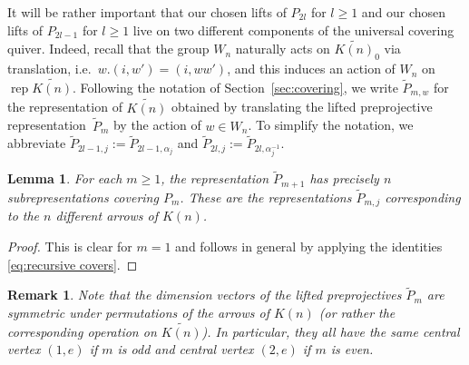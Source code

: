 \documentclass{amsart}
\newtheorem{lemma}[theorem]{Lemma}
\newtheorem{remark}[theorem]{Remark}
\numberwithin{equation}{section}
\newcommand{\rep}{\operatorname{rep}}
\begin{document}
It will be rather important that our chosen lifts of $P_{2l}$ for $l\ge1$ and our chosen lifts of $P_{2l-1}$ for $l\ge1$ live on two different components of the universal covering quiver.
Indeed, recall that the group $W_n$ naturally acts on $\widetilde{K(n)}_0$ via translation, i.e.~$w.(i,w')=(i,ww')$, and this induces an action of $W_n$ on $\rep\widetilde{K(n)}$.
Following the notation of Section~\ref{sec:covering}, we write $\tilde P_{m,w}$ for the representation of $\widetilde{K(n)}$ obtained by translating the lifted preprojective representation~$\tilde P_m$ by the action of $w\in W_n$.
To simplify the notation, we abbreviate $\tilde P_{2l-1,j}:=\tilde P_{2l-1,\alpha_j}$ and $\tilde P_{2l,j}:=\tilde P_{2l,\alpha_j^{-1}}$.
\begin{lemma}
  \label{le:shifted subreps}
  For each $m\ge1$, the representation $\tilde P_{m+1}$ has precisely $n$ subrepresentations covering $P_m$.
  These are the representations $\tilde P_{m,j}$ corresponding to the $n$ different arrows of $K(n)$. 
\end{lemma}
\begin{proof}
  This is clear for $m=1$ and follows in general by applying the identities \eqref{eq:recursive covers}.
\end{proof}
\begin{remark}
  Note that the dimension vectors of the lifted preprojectives $\tilde P_m$ are symmetric under permutations of the arrows of $K(n)$ (or rather the corresponding operation on $\widetilde{K(n)}$).
  In particular, they all have the same central vertex $(1,e)$ if $m$ is odd and central vertex $(2,e)$ if $m$ is even.
\end{remark}
\end{document}
